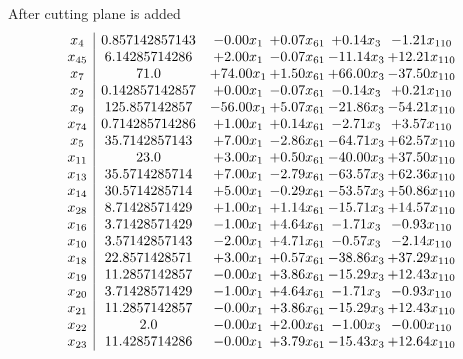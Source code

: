 \documentclass[8pt]{article}
\begin{document}
 After cutting plane is added 
\[\begin{array}{c| c c@{\hskip 2pt} c@{\hskip 2pt} c@{\hskip 2pt} c@{\hskip 2pt} }
 x_{4}   &  0.857142857143 & -0.00 x_{1} & +  0.07 x_{61} & +  0.14 x_{3} & -1.21 x_{110}\\
 x_{45}   &  6.14285714286 & +  2.00 x_{1} & -0.07 x_{61} & -11.14 x_{3} & + 12.21 x_{110}\\
 x_{7}   &  71.0 & + 74.00 x_{1} & +  1.50 x_{61} & + 66.00 x_{3} & -37.50 x_{110}\\
 x_{2}   &  0.142857142857 & +  0.00 x_{1} & -0.07 x_{61} & -0.14 x_{3} & +  0.21 x_{110}\\
 x_{9}   &  125.857142857 & -56.00 x_{1} & +  5.07 x_{61} & -21.86 x_{3} & -54.21 x_{110}\\
 x_{74}   &  0.714285714286 & +  1.00 x_{1} & +  0.14 x_{61} & -2.71 x_{3} & +  3.57 x_{110}\\
 x_{5}   &  35.7142857143 & +  7.00 x_{1} & -2.86 x_{61} & -64.71 x_{3} & + 62.57 x_{110}\\
 x_{11}   &  23.0 & +  3.00 x_{1} & +  0.50 x_{61} & -40.00 x_{3} & + 37.50 x_{110}\\
 x_{13}   &  35.5714285714 & +  7.00 x_{1} & -2.79 x_{61} & -63.57 x_{3} & + 62.36 x_{110}\\
 x_{14}   &  30.5714285714 & +  5.00 x_{1} & -0.29 x_{61} & -53.57 x_{3} & + 50.86 x_{110}\\
 x_{28}   &  8.71428571429 & +  1.00 x_{1} & +  1.14 x_{61} & -15.71 x_{3} & + 14.57 x_{110}\\
 x_{16}   &  3.71428571429 & -1.00 x_{1} & +  4.64 x_{61} & -1.71 x_{3} & -0.93 x_{110}\\
 x_{10}   &  3.57142857143 & -2.00 x_{1} & +  4.71 x_{61} & -0.57 x_{3} & -2.14 x_{110}\\
 x_{18}   &  22.8571428571 & +  3.00 x_{1} & +  0.57 x_{61} & -38.86 x_{3} & + 37.29 x_{110}\\
 x_{19}   &  11.2857142857 & -0.00 x_{1} & +  3.86 x_{61} & -15.29 x_{3} & + 12.43 x_{110}\\
 x_{20}   &  3.71428571429 & -1.00 x_{1} & +  4.64 x_{61} & -1.71 x_{3} & -0.93 x_{110}\\
 x_{21}   &  11.2857142857 & -0.00 x_{1} & +  3.86 x_{61} & -15.29 x_{3} & + 12.43 x_{110}\\
 x_{22}   &  2.0 & -0.00 x_{1} & +  2.00 x_{61} & -1.00 x_{3} & -0.00 x_{110}\\
 x_{23}   &  11.4285714286 & -0.00 x_{1} & +  3.79 x_{61} & -15.43 x_{3} & + 12.64 x_{110}\\

\end{array}\]
\end{document}
